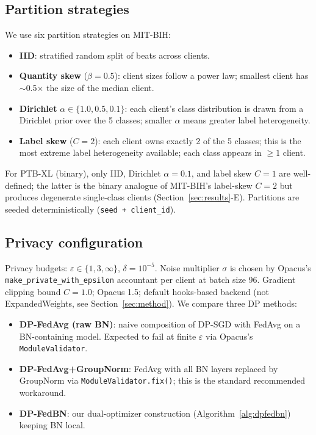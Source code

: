 \documentclass[conference]{IEEEtran}
\newcommand{\code}[1]{\texttt{\small #1}}
\begin{document}
\subsection{Partition strategies}
We use six partition strategies on MIT-BIH:
\begin{itemize}
\item \textbf{IID}: stratified random split of beats across clients.
\item \textbf{Quantity skew} ($\beta{=}0.5$): client sizes follow a power law; smallest client has $\sim$0.5$\times$ the size of the median client.
\item \textbf{Dirichlet} $\alpha \in \{1.0, 0.5, 0.1\}$: each client's class distribution is drawn from a Dirichlet prior over the 5 classes; smaller $\alpha$ means greater label heterogeneity.
\item \textbf{Label skew} ($C{=}2$): each client owns exactly 2 of the 5 classes; this is the most extreme label heterogeneity available; each class appears in $\geq 1$ client.
\end{itemize}
For PTB-XL (binary), only IID, Dirichlet $\alpha{=}0.1$, and label skew $C{=}1$ are well-defined; the latter is the binary analogue of MIT-BIH's label-skew $C{=}2$ but produces degenerate single-class clients (Section~\ref{sec:results}-E). Partitions are seeded deterministically (\code{seed + client\_id}).

\subsection{Privacy configuration}
Privacy budgets: $\varepsilon \in \{1, 3, \infty\}$, $\delta = 10^{-5}$. Noise multiplier $\sigma$ is chosen by Opacus's \code{make\_private\_with\_epsilon} accountant per client at batch size 96. Gradient clipping bound $C = 1.0$; Opacus 1.5; default hooks-based backend (not ExpandedWeights, see Section~\ref{sec:method}). We compare three DP methods:
\begin{itemize}
\item \textbf{DP-FedAvg (raw BN)}: naive composition of DP-SGD with FedAvg on a BN-containing model. Expected to fail at finite $\varepsilon$ via Opacus's \code{ModuleValidator}.
\item \textbf{DP-FedAvg+GroupNorm}: FedAvg with all BN layers replaced by GroupNorm via \code{ModuleValidator.fix()}; this is the standard recommended workaround.
\item \textbf{DP-FedBN}: our dual-optimizer construction (Algorithm~\ref{alg:dpfedbn}) keeping BN local.
\end{itemize}
\end{document}
